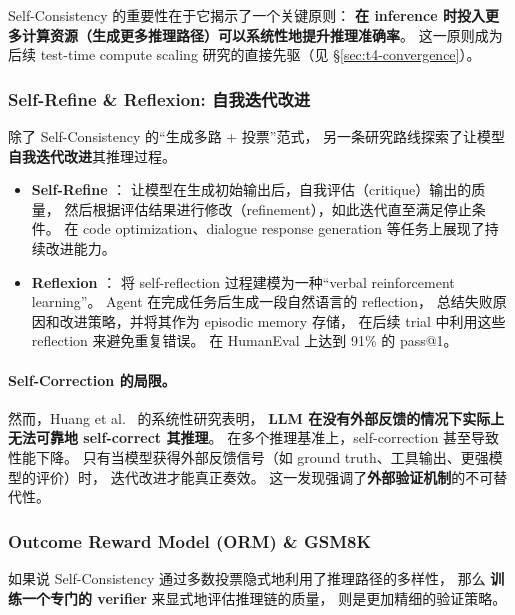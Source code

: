 \noindent
Self-Consistency 的重要性在于它揭示了一个关键原则：
\textbf{在 inference 时投入更多计算资源（生成更多推理路径）可以系统性地提升推理准确率}。
这一原则成为后续 test-time compute scaling 研究的直接先驱（见 \S\ref{sec:t4-convergence}）。

\subsubsection{Self-Refine \& Reflexion: 自我迭代改进}

除了 Self-Consistency 的``生成多路 + 投票''范式，
另一条研究路线探索了让模型\textbf{自我迭代改进}其推理过程。

\begin{itemize}[leftmargin=2em]
  \item \textbf{Self-Refine} \cite{madaan2023selfrefine}：
    让模型在生成初始输出后，自我评估（critique）输出的质量，
    然后根据评估结果进行修改（refinement），如此迭代直至满足停止条件。
    在 code optimization、dialogue response generation 等任务上展现了持续改进能力。

  \item \textbf{Reflexion} \cite{shinn2023reflexion}：
    将 self-reflection 过程建模为一种``verbal reinforcement learning''。
    Agent 在完成任务后生成一段自然语言的 reflection，
    总结失败原因和改进策略，并将其作为 episodic memory 存储，
    在后续 trial 中利用这些 reflection 来避免重复错误。
    在 HumanEval 上达到 91\% 的 pass@1。
\end{itemize}

\paragraph{Self-Correction 的局限。}
然而，Huang et al.\ \cite{huang2024selfcorrect} 的系统性研究表明，
\textbf{LLM 在没有外部反馈的情况下实际上无法可靠地 self-correct 其推理}。
在多个推理基准上，self-correction 甚至导致性能下降。
只有当模型获得外部反馈信号（如 ground truth、工具输出、更强模型的评价）时，
迭代改进才能真正奏效。
这一发现强调了\textbf{外部验证机制}的不可替代性。

\subsubsection{Outcome Reward Model (ORM) \& GSM8K}
\label{sec:t4-orm}

如果说 Self-Consistency 通过多数投票隐式地利用了推理路径的多样性，
那么 \textbf{训练一个专门的 verifier} 来显式地评估推理链的质量，
则是更加精细的验证策略。

